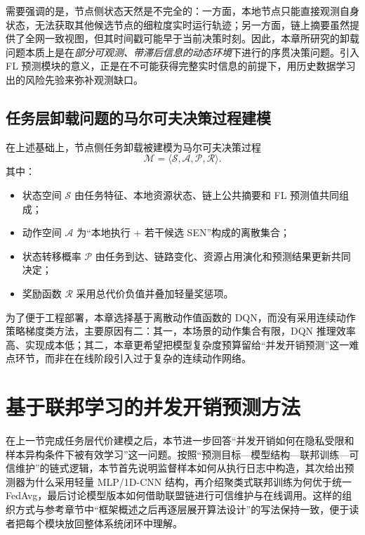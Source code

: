 需要强调的是，节点侧状态天然是不完全的：一方面，本地节点只能直接观测自身状态，无法获取其他候选节点的细粒度实时运行轨迹；另一方面，链上摘要虽然提供了全网一致视图，但其时间戳可能早于当前决策时刻。因此，本章所研究的卸载问题本质上是在\emph{部分可观测、带滞后信息的动态环境}下进行的序贯决策问题。引入 FL 预测模块的意义，正是在不可能获得完整实时信息的前提下，用历史数据学习出的风险先验来弥补观测缺口。

\subsection{任务层卸载问题的马尔可夫决策过程建模}

在上述基础上，节点侧任务卸载被建模为马尔可夫决策过程
\begin{equation}
\mathcal{M} = \langle \mathcal{S}, \mathcal{A}, \mathcal{P}, \mathcal{R} \rangle.
\end{equation}
其中：
\begin{itemize}[leftmargin=2.5em]
    \item 状态空间 $\mathcal{S}$ 由任务特征、本地资源状态、链上公共摘要和 FL 预测值共同组成；
    \item 动作空间 $\mathcal{A}$ 为“本地执行 + 若干候选 SEN”构成的离散集合；
    \item 状态转移概率 $\mathcal{P}$ 由任务到达、链路变化、资源占用演化和预测结果更新共同决定；
    \item 奖励函数 $\mathcal{R}$ 采用总代价负值并叠加轻量奖惩项。
\end{itemize}

为了便于工程部署，本章选择基于离散动作值函数的 DQN，而没有采用连续动作策略梯度类方法，主要原因有二：其一，本场景的动作集合有限，DQN 推理效率高、实现成本低；其二，本章更希望把模型复杂度预算留给“并发开销预测”这一难点环节，而非在在线阶段引入过于复杂的连续动作网络。

\section{基于联邦学习的并发开销预测方法}
\label{sec:fl_prediction}
在上一节完成任务层代价建模之后，本节进一步回答“并发开销如何在隐私受限和样本异构条件下被有效学习”这一问题。按照“预测目标—模型结构—联邦训练—可信维护”的链式逻辑，本节首先说明监督样本如何从执行日志中构造，其次给出预测器为什么采用轻量 MLP/1D-CNN 结构，再介绍聚类式联邦训练为何优于统一 FedAvg，最后讨论模型版本如何借助联盟链进行可信维护与在线调用。这样的组织方式与参考章节中“框架概述之后再逐层展开算法设计”的写法保持一致，便于读者把每个模块放回整体系统闭环中理解。



